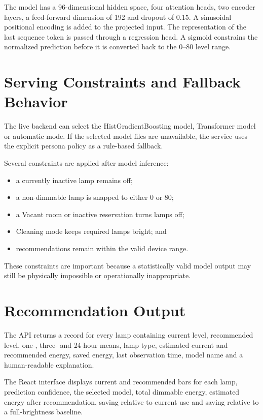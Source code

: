 The model has a 96-dimensional hidden space, four attention heads, two encoder
layers, a feed-forward dimension of 192 and dropout of 0.15. A sinusoidal
positional encoding is added to the projected input. The representation of the
last sequence token is passed through a regression head. A sigmoid constrains
the normalized prediction before it is converted back to the 0--80 level
range.

\section{Serving Constraints and Fallback Behavior}

The live backend can select the HistGradientBoosting model, Transformer model
or automatic mode. If the selected model files are unavailable, the service
uses the explicit persona policy as a rule-based fallback.

Several constraints are applied after model inference:

\begin{itemize}
    \item a currently inactive lamp remains off;
    \item a non-dimmable lamp is snapped to either 0 or 80;
    \item a Vacant room or inactive reservation turns lamps off;
    \item Cleaning mode keeps required lamps bright; and
    \item recommendations remain within the valid device range.
\end{itemize}

These constraints are important because a statistically valid model output
may still be physically impossible or operationally inappropriate.

\section{Recommendation Output}

The API returns a record for every lamp containing current level, recommended
level, one-, three- and 24-hour means, lamp type, estimated current and
recommended energy, saved energy, last observation time, model name and a
human-readable explanation.

The React interface displays current and recommended bars for each lamp,
prediction confidence, the selected model, total dimmable energy, estimated
energy after recommendation, saving relative to current use and saving relative
to a full-brightness baseline.


